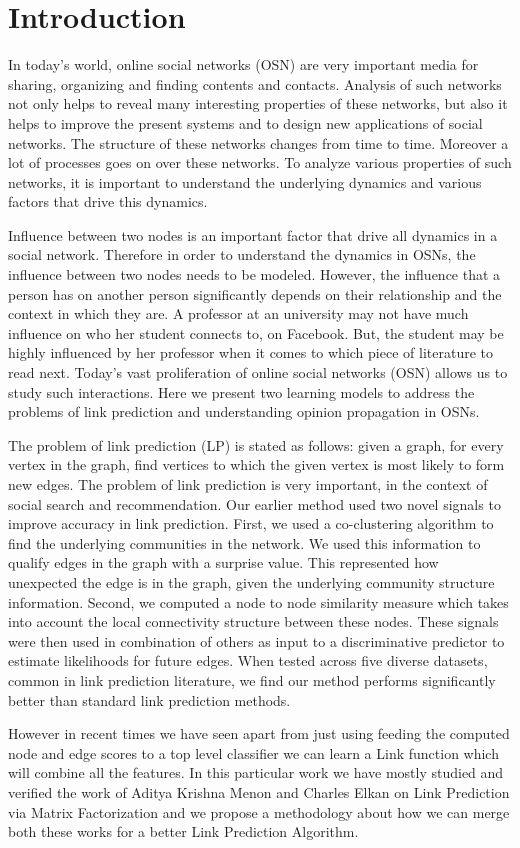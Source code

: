 \section*{Introduction}
In today’s world, online social networks (OSN) are very important media for sharing, organizing and finding contents and contacts. Analysis of such networks not only helps to reveal many interesting properties of these networks, but also it helps to improve the present systems and to design new applications of social networks. The structure of these networks changes from time to time. Moreover a lot of processes goes on over these networks. To analyze various properties of such networks, it is important to understand the underlying dynamics and various factors that drive this dynamics.

Influence between two nodes is an important factor that drive all dynamics in a social network. Therefore in order to understand the dynamics in OSNs, the influence between two nodes needs to be modeled. However, the influence that a person has on another person significantly depends on their relationship and the context in which they are. A professor at an university may not have much influence on who her student connects to, on Facebook. But, the student may be highly influenced by her professor when it comes to which piece of literature to read next. Today’s vast proliferation of online social networks (OSN) allows us to study such interactions. Here we present two learning models to address the problems of link prediction and understanding opinion propagation in OSNs.

The problem of link prediction (LP) is stated as follows: given a graph, for every vertex in the graph, find vertices to which the given vertex is most likely to form new edges. The problem of link prediction is very important, in the context of social search and recommendation. Our earlier method used two novel signals to improve accuracy in link prediction. First, we used a co-clustering algorithm to find the underlying communities in the network. We used this information to qualify edges in the graph with a surprise value. This represented how unexpected the edge is in the graph, given the underlying community structure information. Second, we computed a node to node similarity measure which takes into account the local connectivity structure between these nodes. These signals were then used in combination of others as input to a discriminative predictor to estimate likelihoods for future edges. When tested across five diverse datasets, common in link prediction literature, we find our method performs significantly better than standard link prediction methods.

However in recent times we have seen apart from just using feeding the computed node and edge scores to a top level classifier we can learn a Link function which will combine all the features. In this particular work we have mostly studied and verified the work of Aditya Krishna Menon and Charles Elkan on Link Prediction via Matrix Factorization and we propose a methodology about how we can merge both these works for a better Link Prediction Algorithm. 
